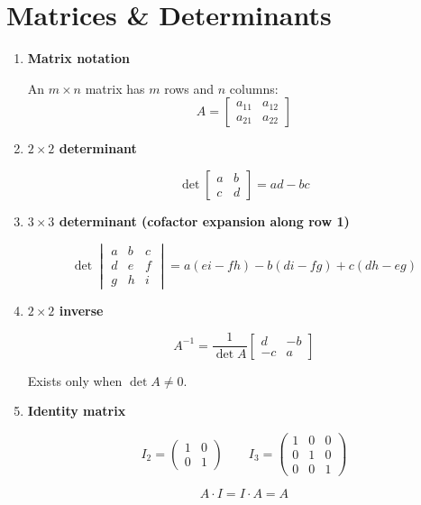 \documentclass[10pt,letterpaper]{article}
\begin{document}
\section{Matrices \& Determinants}

\begin{enumerate}

\item \textbf{Matrix notation}

An $m \times n$ matrix has $m$ rows and $n$ columns:
$$A = \begin{bmatrix} a_{11} & a_{12} \\ a_{21} & a_{22} \end{bmatrix}$$

\item \textbf{$2\times2$ determinant}

$$\det\begin{bmatrix}a & b \\ c & d\end{bmatrix} = ad - bc$$

\item \textbf{$3\times3$ determinant (cofactor expansion along row 1)}

$$\det\begin{vmatrix}a & b & c \\ d & e & f \\ g & h & i\end{vmatrix}
= a(ei-fh) - b(di-fg) + c(dh-eg)$$

\item \textbf{$2\times2$ inverse}

$$A^{-1} = \frac{1}{\det A}\begin{bmatrix}d & -b \\ -c & a\end{bmatrix}$$

Exists only when $\det A \ne 0$.

\item \textbf{Identity matrix}

$$I_2 = \begin{pmatrix}1 & 0 \\ 0 & 1\end{pmatrix} \qquad I_3 = \begin{pmatrix}1 & 0 & 0 \\ 0 & 1 & 0 \\ 0 & 0 & 1\end{pmatrix}$$

$$A \cdot I = I \cdot A = A$$


\end{enumerate}
\end{document}
